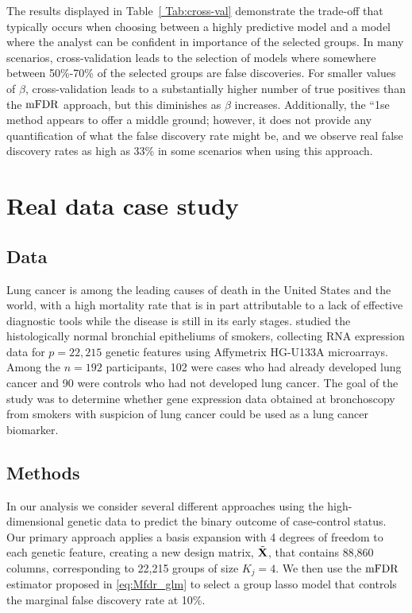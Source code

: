 The results displayed in Table~\ref{ Tab:cross-val} demonstrate the trade-off that typically occurs when choosing between a highly predictive model and a model where the analyst can be confident in importance of the selected groups.  In many scenarios, cross-validation leads to the selection of models where somewhere between 50\%-70\% of the selected groups are false discoveries.  For smaller values of $\beta$, cross-validation leads to a substantially higher number of true positives than the $\textrm{mFDR}$ approach, but this diminishes as $\beta$ increases.  Additionally, the ``1se method appears to offer a middle ground; however, it does not provide any quantification of what the false discovery rate might be, and we observe real false discovery rates as high as 33\% in some scenarios when using this approach.

\section{Real data case study}

\subsection{Data}

Lung cancer is among the leading causes of death in the United States and the world, with a high mortality rate that is in part attributable to a lack of effective diagnostic tools while the disease is still in its early stages. \citet{Spira2007} studied the histologically normal bronchial epitheliums of smokers, collecting RNA expression data for $p = 22,215$ genetic features using Affymetrix HG-U133A microarrays. Among the $n = 192$ participants, 102 were cases who had already developed lung cancer and 90 were controls who had not developed lung cancer. The goal of the study was to determine whether gene expression data obtained at bronchoscopy from smokers with suspicion of lung cancer could be used as a lung cancer biomarker.

\subsection{Methods}

In our analysis we consider several different approaches using the high-dimensional genetic data to predict the binary outcome of case-control status. Our primary approach applies a basis expansion with 4 degrees of freedom to each genetic feature, creating a new design matrix, $\tilde{\mathbf{X}}$, that contains 88,860 columns, corresponding to 22,215 groups of size $K_j = 4$. We then use the $\textrm{mFDR}$ estimator proposed in \ref{eq:Mfdr_glm} to select a group lasso model that controls the marginal false discovery rate at 10\%. 

